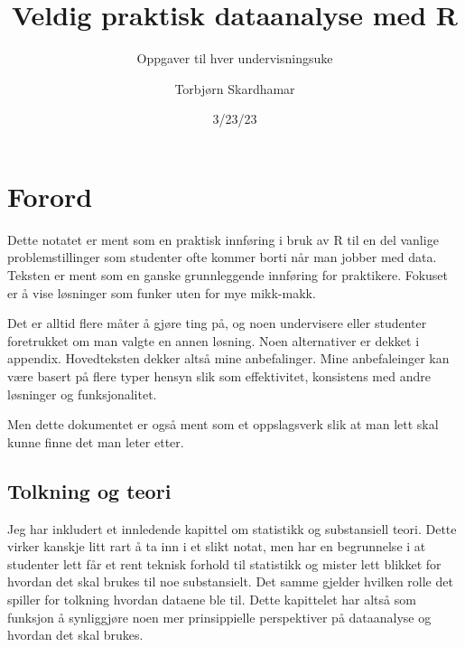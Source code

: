 \documentclass[
  letterpaper,
  DIV=11,
  numbers=noendperiod]{scrreprt}
\title{Veldig praktisk dataanalyse med R}
\subtitle{Oppgaver til hver undervisningsuke}
\author{Torbjørn Skardhamar}
\date{3/23/23}
\renewcommand*\contentsname{Table of contents}
\newcommand\contentsname{Table of contents}
\begin{document}
\maketitle
\ifdefined\Shaded\renewenvironment{Shaded}{\begin{tcolorbox}[frame hidden, breakable, borderline west={3pt}{0pt}{shadecolor}, sharp corners, interior hidden, enhanced, boxrule=0pt]}{\end{tcolorbox}}\fi

\renewcommand*\contentsname{Table of contents}
{
\hypersetup{linkcolor=}
\setcounter{tocdepth}{1}
\tableofcontents
}

\hypertarget{forord}{%
\chapter*{Forord}\label{forord}}


Dette notatet er ment som en praktisk innføring i bruk av R til en del
vanlige problemstillinger som studenter ofte kommer borti når man jobber
med data. Teksten er ment som en ganske grunnleggende innføring for
praktikere. Fokuset er å vise løsninger som funker uten for mye
mikk-makk.

Det er alltid flere måter å gjøre ting på, og noen undervisere eller
studenter foretrukket om man valgte en annen løsning. Noen alternativer
er dekket i appendix. Hovedteksten dekker altså mine anbefalinger. Mine
anbefaleinger kan være basert på flere typer hensyn slik som
effektivitet, konsistens med andre løsninger og funksjonalitet.

Men dette dokumentet er også ment som et oppslagsverk slik at man lett
skal kunne finne det man leter etter.

\hypertarget{tolkning-og-teori}{%
\section*{Tolkning og teori}\label{tolkning-og-teori}}


Jeg har inkludert et innledende kapittel om statistikk og substansiell
teori. Dette virker kanskje litt rart å ta inn i et slikt notat, men har
en begrunnelse i at studenter lett får et rent teknisk forhold til
statistikk og mister lett blikket for hvordan det skal brukes til noe
substansielt. Det samme gjelder hvilken rolle det spiller for tolkning
hvordan dataene ble til. Dette kapittelet har altså som funksjon å
synliggjøre noen mer prinsippielle perspektiver på dataanalyse og
hvordan det skal brukes.
\end{document}
